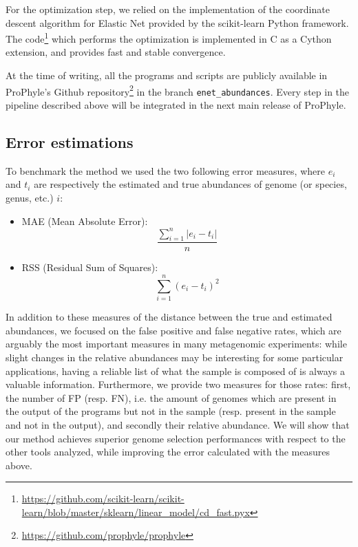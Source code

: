For the optimization step, we relied on the implementation of the coordinate descent algorithm for Elastic Net provided by the scikit-learn Python framework. The code\footnote{\url{https://github.com/scikit-learn/scikit-learn/blob/master/sklearn/linear_model/cd_fast.pyx}} which performs the optimization is implemented in C as a Cython extension, and provides fast and stable convergence.

At the time of writing, all the programs and scripts are publicly available in ProPhyle's Github repository\footnote{\url{https://github.com/prophyle/prophyle}} in the branch \texttt{enet\_abundances}. Every step in the pipeline described above will be integrated in the next main release of ProPhyle.

\subsection{Error estimations}

To benchmark the method we used the two following error measures, where $e_i$ and $t_i$ are respectively the estimated and true abundances of genome (or species, genus, etc.) $i$:
\begin{itemize}
  \item MAE (Mean Absolute Error):
  \begin{equation*}
    \frac{\sum_{i=1}^n |e_i - t_i|}{n}
  \end{equation*}
  \item RSS (Residual Sum of Squares):
  \begin{equation*}
    \sum_{i=1}^n (e_i - t_i)^2
  \end{equation*}
\end{itemize}

In addition to these measures of the distance between the true and estimated abundances, we focused on the false positive and false negative rates, which are arguably the most important measures in many metagenomic experiments: while slight changes in the relative abundances may be interesting for some particular applications, having a reliable list of what the sample is composed of is always a valuable information. Furthermore, we provide two measures for those rates: first, the number of FP (resp. FN), i.e. the amount of genomes which are present in the output of the programs but not in the sample (resp. present in the sample and not in the output), and secondly their relative abundance. We will show that our method achieves superior genome selection performances with respect to the other tools analyzed, while improving the error calculated with the measures above.
